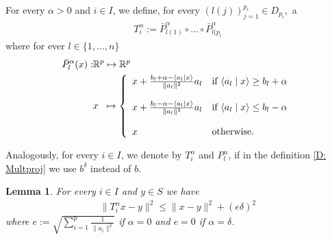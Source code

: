 \documentclass[11pt]{report}
\newcommand{\scal}[2]{{\left\langle{{#1}\mid{#2}}\right\rangle}}
\newtheorem{lemma}[theorem]{Lemma}
\theoremstyle{plain}{\theorembodyfont{\rmfamily}%
\newtheorem{assumption}[theorem]{Assumption}}
\theoremstyle{plain}{\theorembodyfont{\rmfamily}%
\newtheorem{algorithm}[theorem]{Algorithm}}
\theoremstyle{plain}{\theorembodyfont{\rmfamily}%
\newtheorem{example}[theorem]{Example}}
\theoremstyle{plain}{\theorembodyfont{\rmfamily}%
\newtheorem{remark}[theorem]{Remark}}
\theoremstyle{plain}{\theorembodyfont{\rmfamily}%
\newtheorem{definition}[theorem]{Definition}}
\theoremstyle{plain}{\theorembodyfont{\rmfamily}%
\newtheorem{problem}[theorem]{Problem}}
\numberwithin{equation}{chapter}
\newcommand{\prim}{x}
\begin{document}
\begin{definition}
\label{D: Multproj}
 For every $\alpha>0$ and $i \in I$, we define, for every $\left(l(j)\right)_{j=1}^{p_i}\in D_{p_i},$ a 
\begin{align}
  T^{\alpha}_i:=\bar{P}^{\alpha}_{l(1)}\circ\ldots\circ \bar{P}^{\alpha}_{l(p_{i}}
    \label{d: averaged1}
\end{align} where for ever $l\in \{1,\ldots, n\}$
\begin{align}
    \bar{P}^{\alpha}_{l}(\prim):&\mathbb{R}^p \mapsto \mathbb{R}^p\nonumber\\& \prim\hspace{2mm} \mapsto  \left\{ \begin{array}{ll} \prim+\frac{b_{l}+\alpha-\scal{a_l}{\prim}}{\|a_{l}\|^2}a_{l}
             &  \text{if }  \scal{a_l}{\prim} \geq b_l+\alpha \\
             \\ \prim+\frac{b_{l}-\alpha-\scal{a_l}{\prim}}{\|a_{l}\|^2}a_{l}
             &  \text{if  }\scal{a_l}{\prim} \leq b_l-\alpha \\
             \\ \prim &  \text{otherwise.}
             \end{array}\right.
    \label{e: linearpro1}
\end{align}
\end{definition}
Analogously, for every $i\in I$, we denote by $T^{\alpha}_{i}$ and $P^\alpha_l$, if in the definition \ref{D: Multproj}  we use $b^\delta$ instead of $b$. 
\begin{lemma}
\label{L: strutured error}
For every $i\in I$ and $y\in S$  we have
\begin{align}
    \|T^{\alpha}_{i}\prim-y\|^2\leq \|\prim-y\|^2+\left(e\delta\right)^2
\end{align}
where  $e:=\sqrt{\sum_{i=1}^{p}\frac{1}{\|a_{i}\|^2}}$ if $\alpha=0$ and $e=0$ if $\alpha=\delta$.
\end{lemma}
\end{document}

